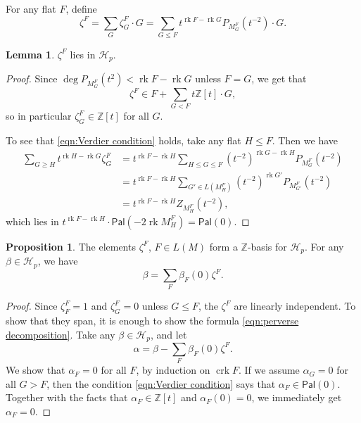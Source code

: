 \documentclass[12pt,reqno]{amsart}
\theoremstyle{definition}
\newtheorem{lemma}[theorem]{Lemma}
\newtheorem{proposition}[theorem]{Proposition}
\theoremstyle{remark}
\newcommand{\crk}{\operatorname{crk}}
\newcommand{\rk}{\operatorname{rk}}
\newcommand{\Z}{{\mathbb{Z}}}
\renewcommand{\(}{\left(}
\renewcommand{\)}{\right)}
\newcommand{\<}{\left<}
\renewcommand{\>}{\right>}
\newcommand{\cal}{\mathcal}
\newcommand{\cH}{{\cal H}}
\newcommand{\Pal}{\mathsf{Pal}}
\begin{document}
For any flat $F$, define 
\[\zeta^F = \sum_G \zeta^F_G \cdot G = 
\sum_{G\le F} t^{\rk F - \rk G}P_{M^F_G}(t^{-2}) \cdot G.\]
\begin{lemma}  $\zeta^F$ lies in $\cH_p$.
\end{lemma}
\begin{proof}
Since $\deg P_{M^F_G}(t^2) < \rk F - \rk G$ unless $F = G$, we get that 
\[\zeta^F \in F + \sum_{G < F} t\Z[t]\cdot G,\]
so in particular $\zeta^F_G \in \Z[t]$ for all $G$.

To see that \eqref{eqn:Verdier condition} holds, take any flat $H\le F$.  Then we have 
\begin{align*}
\sum_{G \ge H} t^{\rk H-\rk G}\zeta^F_G & = t^{\rk F - \rk H}\sum_{H \le G\le F} (t^{-2})^{\rk G - \rk H}P_{M^F_G}(t^{-2}) \\
& = t^{\rk F - \rk H}\sum_{G' \in L(M^F_H)} (t^{-2})^{\rk G'}P_{M^F_{G'}}(t^{-2})\\
& = t^{\rk F - \rk H}Z_{M^F_H}(t^{-2}),
\end{align*}
which lies in
$t^{\rk F-\rk H}\cdot \Pal(-2\rk M^F_H) = \Pal(0)$.
\end{proof}

\begin{proposition}\label{prop:perverse sum formula}
The elements $\zeta^F$, $F\in L(M)$ form a $\Z$-basis for $\cH_p$.  For any $\beta\in \cH_p$, we have
\begin{equation}\label{eqn:perverse decomposition}
\beta = \sum_F \beta_F(0) \zeta^F.
\end{equation}
\end{proposition}
\begin{proof}
Since $\zeta^F_F = 1$ and $\zeta^F_G = 0$ unless $G \le F$, the $\zeta^F$ are linearly independent. 
To show that they span, it is enough to show the
formula \eqref{eqn:perverse decomposition}.  Take any $\beta \in \cH_p$, and let
\[\alpha = \beta - \sum_F \beta_F(0) \zeta^F.\]
We show that $\alpha_F = 0$ for all $F$, by induction on $\crk F$.  If we assume $\alpha_G = 0$ for all $G>F$, then the condition 
\eqref{eqn:Verdier condition} says that $\alpha_F \in \Pal(0)$. Together with the facts that $\alpha_F \in \Z[t]$ and $\alpha_F(0) = 0$, we immediately get $\alpha_F = 0$. 
\end{proof}

\end{document}
